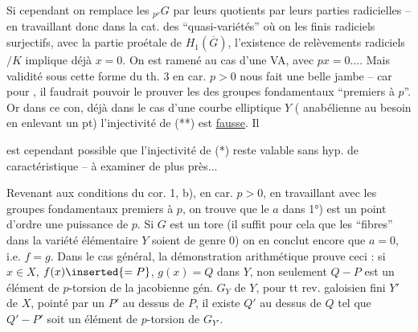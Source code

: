 
Si cependant on remplace les ${}_{p^\nu}G$ par leurs quotients par leurs parties radicielles -- en travaillant donc dans la cat. des ``quasi-variétés'' où on   les   finis radiciels surjectifs,   avec la partie proétale de $H_1(\overline G)$,  l'existence de relèvements radiciels $/K$ implique déjà $x=0$.  On est ramené au cas d'une VA, avec $px=0$.... Mais  validité sous cette forme du th. 3 en car. $p>0$  nous fait une belle jambe -- car pour , il faudrait pouvoir le prouver   les  des groupes fondamentaux ``premiers à $p$''. Or dans ce con, déjà dans le cas d'une courbe elliptique $Y$ (  anabélienne au besoin en enlevant un pt) l'injectivité de (**) est \uline{fausse}. Il


est cependant possible que l'injectivité de (*) reste valable sans hyp. de caractéristique -- à examiner de plus près...

Revenant aux conditions du cor. 1, b), en car. $p>0$, en travaillant avec les groupes fondamentaux premiers à $p$, on trouve que le $a$ dans 1°) est un point  d'ordre une puissance de $p$. Si $G$ est un tore (il suffit pour cela que les ``fibres'' dans la variété élémentaire $Y$ soient de genre 0) on en conclut encore que $a=0$, i.e. $f=g$. Dans le cas général, la démonstration arithmétique prouve  ceci : si $x\in X$,   $f(x)\inserted{=P}$, $g(x)=Q$ dans $Y$, non seulement $Q-P$ est un élément de $p$-torsion de la jacobienne gén. $G_Y$ de $Y$, pour tt rev.  galoisien fini $Y'$ de $X$,  pointé par un $P'$ au dessus de $P$, il existe $Q'$ au dessus de $Q$ tel que $Q'-P'$ soit un élément de  $p$-torsion de $G_{Y'}$.

